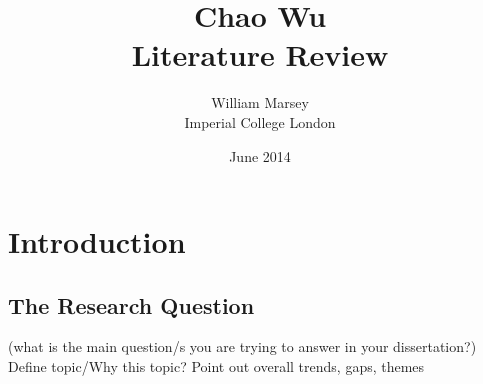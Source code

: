 \documentclass[a4paper,11pt,twoside,notitlepage]{article}
\renewenvironment{abstract}
 {
	\small
  	\begin{center}
  	\bfseries \abstractname\vspace{-.5em}\vspace{0pt}
  	\end{center}
  	\list{}{
    	\setlength{\leftmargin}{.5cm}%
    	\setlength{\rightmargin}{\leftmargin}%
  	}%
  	\item\relax}
 	{\endlist}
\begin{document}
	\title{Chao Wu
		\\ \small Literature Review}
	\author{William Marsey
		\\Imperial College London}
	\date{June 2014}
 	\maketitle
	

	

	

        \section{Introduction}
        \subsection{The Research Question}
        (what is the main question/s you are trying to answer in your dissertation?)
        Define topic/Why this topic?
        Point out overall trends, gaps, themes

\end{document}
